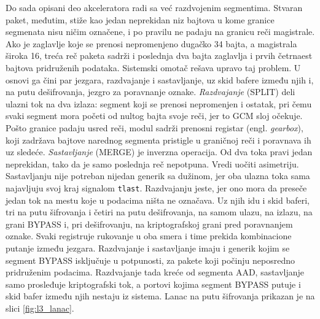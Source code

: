 Do sada opisani deo akceleratora radi sa već razdvojenim segmentima. Stvaran paket, međutim, stiže kao jedan neprekidan niz bajtova u kome granice segmenata nisu ničim označene, i po pravilu ne padaju na granicu reči magistrale. Ako je zaglavlje koje se prenosi nepromenjeno dugačko 34 bajta, a magistrala široka 16, treća reč paketa sadrži i poslednja dva bajta zaglavlja i prvih četrnaest bajtova pridruženih podataka. Sistemski omotač rešava upravo taj problem. U osnovi ga čini par jezgara, razdvajanje i sastavljanje, uz skid bafere između njih i, na putu dešifrovanja, jezgro za poravnanje oznake.
\smallbreak
\textit{Razdvajanje} (SPLIT) deli ulazni tok na dva izlaza: segment koji se prenosi nepromenjen i ostatak, pri čemu svaki segment mora početi od nultog bajta svoje reči, jer to GCM sloj očekuje. Pošto granice padaju usred reči, modul sadrži prenosni registar (engl. \textit{gearbox}), koji zadržava bajtove narednog segmenta pristigle u graničnoj reči i poravnava ih uz sledeće.
\smallbreak
\textit{Sastavljanje} (MERGE) je inverzna operacija. Od dva toka pravi jedan neprekidan, tako da je samo poslednja reč nepotpuna. Vredi uočiti asimetriju. Sastavljanju nije potreban nijedan generik sa dužinom, jer oba ulazna toka sama najavljuju svoj kraj signalom \texttt{tlast}. Razdvajanju jeste, jer ono mora da preseče jedan tok na mestu koje u podacima ništa ne označava.
\smallbreak
Uz njih idu i skid baferi, tri na putu šifrovanja i četiri na putu dešifrovanja, na samom ulazu, na izlazu, na grani BYPASS i, pri dešifrovanju, na kriptografskoj grani pred poravnanjem oznake. Svaki registruje rukovanje u oba smera i time prekida kombinacione putanje između jezgara. Razdvajanje i sastavljanje imaju i generik kojim se segment BYPASS isključuje u potpunosti, za pakete koji počinju neposredno pridruženim podacima. Razdvajanje tada kreće od segmenta AAD, sastavljanje samo prosleđuje kriptografski tok, a portovi kojima segment BYPASS putuje i skid bafer između njih nestaju iz sistema. Lanac na putu šifrovanja prikazan je na slici \ref{fig:l3_lanac}.

